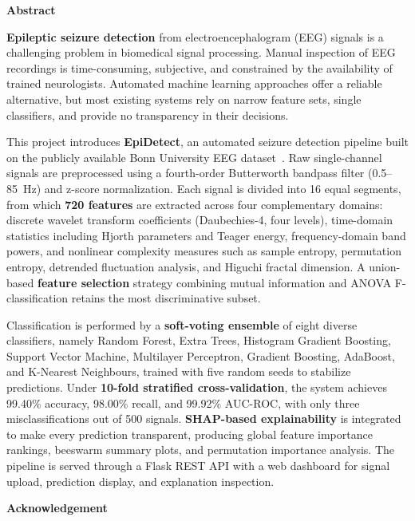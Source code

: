 \documentclass[a4paper, 11pt, oneside]{report}
\begin{document}
\newpage
\begin{center}
    {\LARGE \textbf{Abstract}}
\end{center}
\vspace{0.5cm}

\textbf{Epileptic seizure detection} from electroencephalogram (EEG) signals is a challenging problem in biomedical signal processing. Manual inspection of EEG recordings is time-consuming, subjective, and constrained by the availability of trained neurologists. Automated machine learning approaches offer a reliable alternative, but most existing systems rely on narrow feature sets, single classifiers, and provide no transparency in their decisions.

This project introduces \textbf{EpiDetect}, an automated seizure detection pipeline built on the publicly available Bonn University EEG dataset~\citep{andrzejak2001indications}. Raw single-channel signals are preprocessed using a fourth-order Butterworth bandpass filter (0.5--85~Hz) and z-score normalization. Each signal is divided into 16 equal segments, from which \textbf{720 features} are extracted across four complementary domains: discrete wavelet transform coefficients (Daubechies-4, four levels), time-domain statistics including Hjorth parameters and Teager energy, frequency-domain band powers, and nonlinear complexity measures such as sample entropy, permutation entropy, detrended fluctuation analysis, and Higuchi fractal dimension. A union-based \textbf{feature selection} strategy combining mutual information and ANOVA F-classification retains the most discriminative subset.

Classification is performed by a \textbf{soft-voting ensemble} of eight diverse classifiers, namely Random Forest, Extra Trees, Histogram Gradient Boosting, Support Vector Machine, Multilayer Perceptron, Gradient Boosting, AdaBoost, and K-Nearest Neighbours, trained with five random seeds to stabilize predictions. Under \textbf{10-fold stratified cross-validation}, the system achieves 99.40\% accuracy, 98.00\% recall, and 99.92\% AUC-ROC, with only three misclassifications out of 500 signals. \textbf{SHAP-based explainability} is integrated to make every prediction transparent, producing global feature importance rankings, beeswarm summary plots, and permutation importance analysis. The pipeline is served through a Flask REST API with a web dashboard for signal upload, prediction display, and explanation inspection.

\pagebreak

        \begin{center}
            { \LARGE \textbf{Acknowledgement}}
        \end{center}
	\vspace{2cm}
\end{document}
